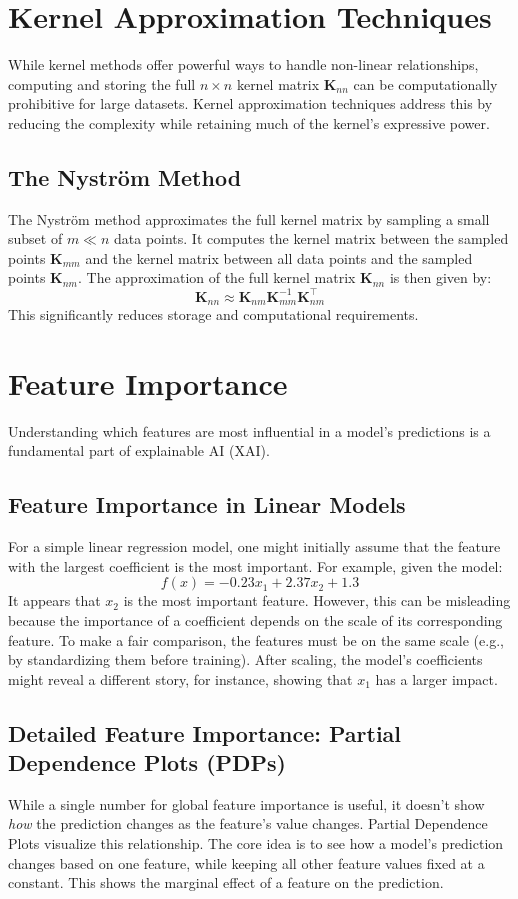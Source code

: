 \documentclass{article}
\begin{document}
\begin{multicols}{2}
	\section{Kernel Approximation Techniques}
	While kernel methods offer powerful ways to handle non-linear relationships, computing and storing the full $n \times n$ kernel matrix $\mathbf{K}_{nn}$ can be computationally prohibitive for large datasets. Kernel approximation techniques address this by reducing the complexity while retaining much of the kernel's expressive power.

	\subsection{The Nyström Method}
	The Nyström method approximates the full kernel matrix by sampling a small subset of $m \ll n$ data points. It computes the kernel matrix between the sampled points $\mathbf{K}_{mm}$ and the kernel matrix between all data points and the sampled points $\mathbf{K}_{nm}$. The approximation of the full kernel matrix $\mathbf{K}_{nn}$ is then given by:
	$$
		\mathbf{K}_{nn} \approx \mathbf{K}_{nm}\mathbf{K}_{mm}^{-1} \mathbf{K}_{nm}^{\top}
	$$
	This significantly reduces storage and computational requirements.

	\section{Feature Importance}
	Understanding which features are most influential in a model's predictions is a fundamental part of explainable AI (XAI).

	\subsection{Feature Importance in Linear Models}
	For a simple linear regression model, one might initially assume that the feature with the largest coefficient is the most important. For example, given the model:
	$$ f(x) = -0.23x_{1} + 2.37x_{2} + 1.3 $$
	It appears that $x_2$ is the most important feature. However, this can be misleading because the importance of a coefficient depends on the scale of its corresponding feature. To make a fair comparison, the features must be on the same scale (e.g., by standardizing them before training). After scaling, the model's coefficients might reveal a different story, for instance, showing that $x_1$ has a larger impact.

	\subsection{Detailed Feature Importance: Partial Dependence Plots (PDPs)}
	While a single number for global feature importance is useful, it doesn't show \textit{how} the prediction changes as the feature's value changes. Partial Dependence Plots visualize this relationship. The core idea is to see how a model's prediction changes based on one feature, while keeping all other feature values fixed at a constant. This shows the marginal effect of a feature on the prediction.


\end{multicols}
\end{document}
